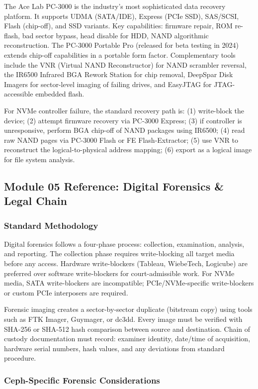 \documentclass[11pt,letterpaper]{article}
\begin{document}
The Ace Lab PC-3000 is the industry's most sophisticated data recovery platform. It supports UDMA (SATA/IDE), Express (PCIe SSD), SAS/SCSI, Flash (chip-off), and SSD variants. Key capabilities: firmware repair, ROM re-flash, bad sector bypass, head disable for HDD, NAND algorithmic reconstruction. The PC-3000 Portable Pro (released for beta testing in 2024) extends chip-off capabilities in a portable form factor. Complementary tools include the VNR (Virtual NAND Reconstructor) for NAND scrambler reversal, the IR6500 Infrared BGA Rework Station for chip removal, DeepSpar Disk Imagers for sector-level imaging of failing drives, and EasyJTAG for JTAG-accessible embedded flash.

For NVMe controller failure, the standard recovery path is: (1) write-block the device; (2) attempt firmware recovery via PC-3000 Express; (3) if controller is unresponsive, perform BGA chip-off of NAND packages using IR6500; (4) read raw NAND pages via PC-3000 Flash or FE Flash-Extractor; (5) use VNR to reconstruct the logical-to-physical address mapping; (6) export as a logical image for file system analysis.

\subsection{Module 05 Reference: Digital Forensics \& Legal Chain}

\subsubsection{Standard Methodology}

Digital forensics follows a four-phase process: collection, examination, analysis, and reporting. The collection phase requires write-blocking all target media before any access. Hardware write-blockers (Tableau, WiebeTech, Logicube) are preferred over software write-blockers for court-admissible work. For NVMe media, SATA write-blockers are incompatible; PCIe/NVMe-specific write-blockers or custom PCIe interposers are required.

Forensic imaging creates a sector-by-sector duplicate (bitstream copy) using tools such as FTK Imager, Guymager, or dc3dd. Every image must be verified with SHA-256 or SHA-512 hash comparison between source and destination. Chain of custody documentation must record: examiner identity, date/time of acquisition, hardware serial numbers, hash values, and any deviations from standard procedure.

\subsubsection{Ceph-Specific Forensic Considerations}
\end{document}
